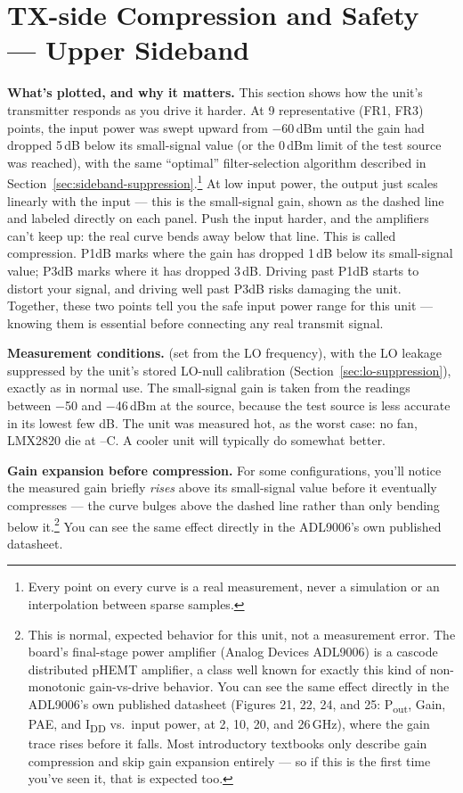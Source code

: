 \clearpage
\section{TX-side Compression and Safety --- Upper Sideband}
\label{sec:compression-upper}

\textbf{What's plotted, and why it matters.} This section shows how the unit's transmitter responds as you
drive it harder. At 9 representative (FR1, FR3) points, the input power was swept upward from −60\,dBm until the gain had
dropped 5\,dB below its small-signal value (or the 0\,dBm limit of the test source was reached), with the same ``optimal''
filter-selection algorithm described in Section~\ref{sec:sideband-suppression}.\footnote{Every point on every curve is a real measurement,
never a simulation or an interpolation between sparse samples.} At low input power, the output just scales
linearly with the input --- this is the small-signal gain, shown as the dashed line and labeled directly on
each panel. Push the input harder, and the amplifiers can't keep up: the real curve bends away below that line.
This is called compression. P1dB marks where the gain has dropped 1\,dB below its small-signal value; P3dB
marks where it has dropped 3\,dB. Driving past P1dB starts to distort your signal, and driving well past P3dB
risks damaging the unit. Together, these two points tell you the safe input power range for this unit ---
knowing them is essential before connecting any real transmit signal.

\textbf{Measurement conditions.} \lmxDriveRule{} (set from the LO frequency), with the LO leakage suppressed by the unit's stored LO-null calibration (Section~\ref{sec:lo-suppression}), exactly as in normal use. The small-signal gain is taken from the readings between −50 and −46\,dBm at the source, because the test source is less accurate in its lowest few dB. The unit was measured hot, as the worst case: no fan, LMX2820 die at \condCompMinC--\condCompMaxC\textdegree C. A cooler unit will typically do somewhat better.

\textbf{Gain expansion before compression.} For some configurations, you'll notice the measured gain briefly
\emph{rises} above its small-signal value before it eventually compresses --- the curve bulges above the dashed
line rather than only bending below it.\footnote{This is normal, expected behavior for this unit, not a
measurement error. The board's final-stage power amplifier (Analog Devices ADL9006) is a cascode distributed
pHEMT amplifier, a class well known for exactly this kind of non-monotonic gain-vs-drive behavior. You can see
the same effect directly in the ADL9006's own published datasheet (Figures 21, 22, 24, and 25: P\textsubscript{out},
Gain, PAE, and I\textsubscript{DD} vs.\ input power, at 2, 10, 20, and 26\,GHz), where the gain trace rises before it
falls. Most introductory textbooks only describe gain compression and skip gain expansion entirely --- so if
this is the first time you've seen it, that is expected too.} You can see the same effect directly in the
ADL9006's own published datasheet.

